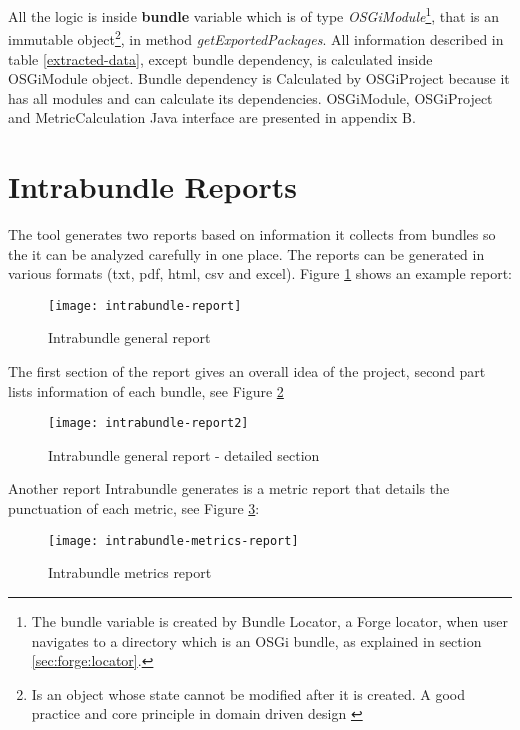 All the logic is inside \textbf{bundle} variable which is of type \emph{OSGiModule}\footnote{The bundle variable is created by Bundle Locator, a Forge locator, when user navigates to a directory which is an OSGi bundle, as explained in section \ref{sec:forge:locator}.}, that is an immutable object\footnote{Is an object whose state cannot be modified after it is created. A good practice and core principle in domain driven design \citep{Evans 2003}}, in method \emph{getExportedPackages}. All information described in table \ref{extracted-data}, except bundle dependency, is calculated inside OSGiModule object. Bundle dependency is Calculated by OSGiProject because it has all modules and can calculate its dependencies. OSGiModule, OSGiProject and MetricCalculation Java interface are presented in appendix B.



\section{Intrabundle Reports}
\label{sec:intrabundle-reports}
The tool generates two reports based on information it collects from bundles so the it can be analyzed carefully in one place. The reports can be generated in various formats (txt, pdf, html, csv and excel). Figure \ref{intrabundle-report1} shows an example report:  

\begin{figure}[h]
\caption{Intrabundle general report}
\label{intrabundle-report1}
\centering
\texttt{[image: intrabundle-report]}
\end{figure}  
\FloatBarrier

The first section of the report gives an overall idea of the project, second part lists information of each bundle, see Figure \ref{intrabundle-report2} 

\begin{figure}[h]
\caption{Intrabundle general report - detailed section }
\label{intrabundle-report2}
\centering
\texttt{[image: intrabundle-report2]}
\end{figure}  
\FloatBarrier

Another report Intrabundle generates is a metric report that details the punctuation of each metric, see Figure \ref{intrabundle-metrics-report}:  

\begin{figure}[h]
\caption{Intrabundle metrics report}
\label{intrabundle-metrics-report}
\centering
\texttt{[image: intrabundle-metrics-report]}
\end{figure}  
\FloatBarrier

